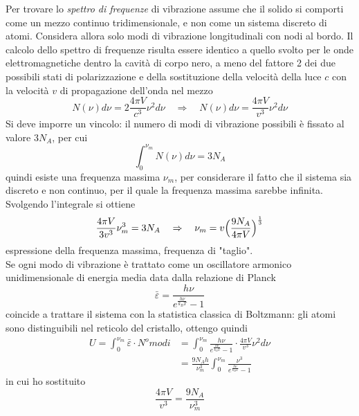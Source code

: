 Per trovare lo \textit{spettro di frequenze} di vibrazione assume che il solido si comporti come un mezzo continuo tridimensionale, e non come un sistema discreto di atomi.
Considera allora solo modi di vibrazione longitudinali con nodi al bordo.
Il calcolo dello spettro di frequenze risulta essere identico a quello svolto per le onde elettromagnetiche dentro la cavità di corpo nero, a meno del fattore 2 dei due possibili stati di polarizzazione e della sostituzione della velocità della luce $c$ con la velocità $v$ di propagazione dell'onda nel mezzo
\begin{equation}
N(\nu)d\nu = 2 \frac{ 4 \pi V}{c^3 } \nu^2 d\nu \quad\Rightarrow\quad N(\nu)d\nu = \frac{ 4 \pi V}{v^3 } \nu^2 d\nu
\end{equation}
Si deve imporre un vincolo: il numero di modi di vibrazione possibili è fissato al valore $3 N_A$, per cui
\begin{equation}
\int_0^{\nu_m} N(\nu)d\nu = 3 N_A 
\end{equation}
quindi esiste una frequenza massima $\nu_m$, per considerare il fatto che il sistema sia discreto e non continuo, per il quale la frequenza massima sarebbe infinita.
Svolgendo l'integrale si ottiene
\begin{equation}
\frac{4\pi V}{3 v^3} \nu_m^3 = 3 N_A 
\quad\Rightarrow\quad
\nu_m = v \Bigl(  \frac{9 N_A}{4 \pi V}  \Bigr)^{ \frac{1}{3} }
\end{equation}
espressione della frequenza massima, frequenza di "taglio". \\
Se ogni modo di vibrazione è trattato come un oscillatore armonico unidimensionale di energia media data dalla relazione di Planck
\begin{equation}
\bar\varepsilon = \frac{h\nu}{e^{ \frac{h\nu}{k_B T} } - 1}
\end{equation}
coincide a trattare il sistema con la statistica classica di Boltzmann: gli atomi sono distinguibili nel reticolo del cristallo, ottengo quindi
\begin{equation}
\begin{split}
U = \int_0^{\nu_m} \bar\varepsilon \cdot N^omodi  
& = \int_0^{\nu_m}  \frac{h\nu}{e^{ \frac{h\nu}{k_B T} } - 1} \cdot \frac{4\pi V}{v^3} \nu^2 d\nu \\
& = \frac{9 N_A h}{\nu_m^3} \int_0^{\nu_m} \frac{\nu^3}{e^{ \frac{h\nu}{k_B T} } - 1}
\end{split}
\label{energia_tot_debye_1}
\end{equation}
in cui ho sostituito 
$$\frac{4\pi V}{v^3} = \frac{9 N_A }{\nu_m^3}$$
